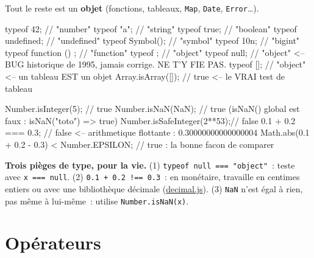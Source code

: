 \documentclass[12pt,a4paper,twoside,openright]{book}
\newcommand{\link}[2]{\href{#2}{#1}}
\begin{document}
Tout le reste est un \textbf{objet} (fonctions, tableaux, \verb|Map|, \verb|Date|, \verb|Error|\ldots).

\begin{codejs}
typeof 42;              // "number"
typeof "a";             // "string"
typeof true;            // "boolean"
typeof undefined;       // "undefined"
typeof Symbol();        // "symbol"
typeof 10n;             // "bigint"
typeof function () {};  // "function"
typeof {};              // "object"
typeof null;            // "object"  <-- BUG historique de 1995, jamais corrige. NE T'Y FIE PAS.
typeof [];              // "object"  <-- un tableau EST un objet
Array.isArray([]);      // true  <-- le VRAI test de tableau

Number.isInteger(5);        // true
Number.isNaN(NaN);          // true   (isNaN() global est faux : isNaN("toto") => true)
Number.isSafeInteger(2**53);// false
0.1 + 0.2 === 0.3;          // false  <-- arithmetique flottante : 0.30000000000000004
Math.abs(0.1 + 0.2 - 0.3) < Number.EPSILON;   // true : la bonne facon de comparer
\end{codejs}

\begin{piege}
\textbf{Trois pi\`eges de type, pour la vie.}
(1) \verb|typeof null === "object"|~: teste avec \verb|x === null|.
(2) \verb|0.1 + 0.2 !== 0.3|~: en mon\'etaire, travaille en centimes entiers ou avec une
biblioth\`eque d\'ecimale (\link{decimal.js}{https://github.com/MikeMcl/decimal.js/}).
(3) \verb|NaN| n'est \'egal \`a rien, pas m\^eme \`a lui-m\^eme~: utilise \verb|Number.isNaN(x)|.
\end{piege}

\section{Op\'erateurs}
\end{document}
